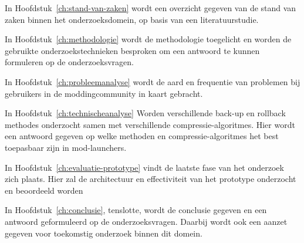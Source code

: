 In Hoofdstuk~\ref{ch:stand-van-zaken} wordt een overzicht gegeven van de stand van zaken binnen het onderzoeksdomein, op basis van een literatuurstudie.

In Hoofdstuk~\ref{ch:methodologie} wordt de methodologie toegelicht en worden de gebruikte onderzoekstechnieken besproken om een antwoord te kunnen formuleren op de onderzoeksvragen.

In Hoofdstuk~\ref{ch:probleemanalyse} wordt de aard en frequentie van problemen bij gebruikers in de moddingcommunity in kaart gebracht.

In Hoofdstuk~\ref{ch:technischeanalyse} Worden verschillende back-up en rollback methodes onderzocht samen met verschillende compressie-algoritmes. Hier wordt een antwoord gegeven op welke methoden en compressie-algoritmes het best toepasbaar zijn in mod-launchers.

In Hoofdstuk~\ref{ch:evaluatie-prototype} vindt de laatste fase van het onderzoek zich plaats. Hier zal de architectuur en effectiviteit van het prototype onderzocht en beoordeeld worden

In Hoofdstuk~\ref{ch:conclusie}, tenslotte, wordt de conclusie gegeven en een antwoord geformuleerd op de onderzoeksvragen. Daarbij wordt ook een aanzet gegeven voor toekomstig onderzoek binnen dit domein.